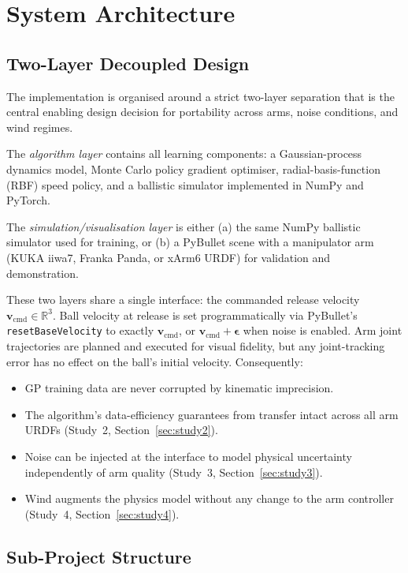 \section{System Architecture}
\label{sec:system}

\subsection{Two-Layer Decoupled Design}
\label{sec:system:design}

The implementation is organised around a strict two-layer separation that is the
central enabling design decision for portability across arms, noise conditions, and
wind regimes.

The \emph{algorithm layer} contains all learning components: a Gaussian-process
dynamics model, Monte Carlo policy gradient optimiser, radial-basis-function (RBF)
speed policy, and a ballistic simulator implemented in NumPy and PyTorch.

The \emph{simulation/visualisation layer} is either (a) the same NumPy ballistic
simulator used for training, or (b) a PyBullet scene with a manipulator arm (KUKA iiwa7,
Franka Panda, or xArm6 URDF) for validation and demonstration.

These two layers share a single interface: the commanded release velocity
$\mathbf{v}_{\mathrm{cmd}} \in \mathbb{R}^3$.
Ball velocity at release is set programmatically via PyBullet's
\texttt{resetBaseVelocity} to exactly $\mathbf{v}_{\mathrm{cmd}}$, or
$\mathbf{v}_{\mathrm{cmd}} + \boldsymbol{\epsilon}$ when noise is enabled.
Arm joint trajectories are planned and executed for visual fidelity, but any
joint-tracking error has no effect on the ball's initial velocity.
Consequently:
\begin{itemize}
  \item GP training data are never corrupted by kinematic imprecision.
  \item The algorithm's data-efficiency guarantees from \cite{turcato2025mcpilot}
        transfer intact across all arm URDFs (Study~2, Section~\ref{sec:study2}).
  \item Noise can be injected at the interface to model physical uncertainty
        independently of arm quality (Study~3, Section~\ref{sec:study3}).
  \item Wind augments the physics model without any change to the arm controller
        (Study~4, Section~\ref{sec:study4}).
\end{itemize}

\subsection{Sub-Project Structure}
\label{sec:system:subprojects}

